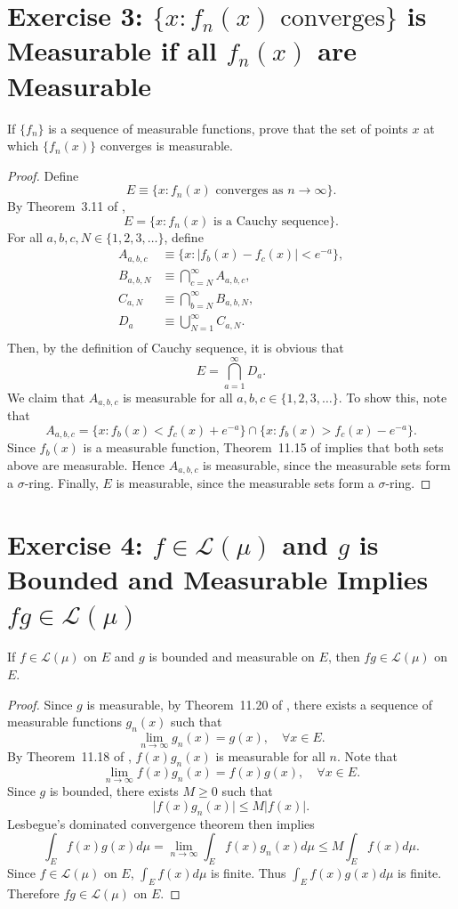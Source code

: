 \documentclass{amsbook}
\theoremstyle{definition}
\theoremstyle{remark}
\numberwithin{section}{chapter}
\numberwithin{equation}{chapter}
\begin{document}
\section{Exercise 3: $\{x:f_n(x)\text{ converges}\}$ is Measurable if all $f_n(x)$ are Measurable}
If $\{f_n\}$ is a sequence of measurable functions, prove that the set of points $x$ at which $\{f_n(x)\}$ converges is measurable.
\begin{proof}
Define\[
E\equiv\{x:f_n(x)\text{ converges as }n\to\infty\}.
\]By Theorem~3.11 of \cite{rudin1976principles}, \[
E=\{x:f_n(x)\text{ is a Cauchy sequence}\}.
\]For all $a,b,c,N\in\{1,2,3,\dots\}$, define\[
\begin{split}
A_{a,b,c}&\equiv\{x:\vert f_b(x)-f_c(x)\vert<e^{-a}\},\\
B_{a,b,N}&\equiv\bigcap_{c=N}^\infty A_{a,b,c},\\
C_{a,N}&\equiv\bigcap_{b=N}^\infty B_{a,b,N},\\
D_{a}&\equiv\bigcup_{N=1}^\infty C_{a,N}.\\
\end{split}
\]Then, by the definition of Cauchy sequence, it is obvious that\[
E=\bigcap_{a=1}^\infty D_a.
\]We claim that $A_{a,b,c}$ is measurable for all $a,b,c\in\{1,2,3,\dots\}$. To show this, note that\[
A_{a,b,c}=\{x: f_b(x)<f_c(x)+e^{-a}\}\cap\{x: f_b(x)>f_c(x)-e^{-a}\}.
\]Since $f_b(x)$ is a measurable function, Theorem~11.15 of \cite{rudin1976principles} implies that both sets above are measurable. Hence $A_{a,b,c}$ is measurable, since the measurable sets form a $\sigma$-ring. Finally, $E$ is measurable, since the measurable sets form a $\sigma$-ring.
\end{proof}

\section{Exercise 4: $f\in\mathscr{L}(\mu)$ and $g$ is Bounded and Measurable Implies $fg\in\mathscr{L}(\mu)$}
If $f\in\mathscr{L}(\mu)$ on $E$ and $g$ is bounded and measurable on $E$, then $fg\in\mathscr{L}(\mu)$ on $E$.
\begin{proof}
Since $g$ is measurable, by Theorem~11.20 of \cite{rudin1976principles}, there exists a sequence of measurable functions $g_n(x)$ such that\[
\lim_{n\to\infty}g_n(x)=g(x),\quad\forall x\in E.
\]By Theorem~11.18 of \cite{rudin1976principles}, $f(x)g_n(x)$ is measurable for all $n$. Note that\[
\lim_{n\to\infty}f(x)g_n(x)=f(x)g(x),\quad\forall x\in E.
\]Since $g$ is bounded, there exists $M\geqslant0$ such that\[
\vert f(x)g_n(x)\vert\leqslant M\vert f(x)\vert.
\]Lesbegue's dominated convergence theorem then implies\[
\int_E f(x)g(x)d\mu=\lim_{n\to\infty}\int_E f(x)g_n(x)d\mu\leqslant M\int_E f(x)d\mu.
\]Since $f\in\mathscr{L}(\mu)$ on $E$, $\int_E f(x)d\mu$ is finite. Thus $\int_E f(x)g(x)d\mu$ is finite. Therefore $fg\in\mathscr{L}(\mu)$ on $E$.
\end{proof}
\end{document}
